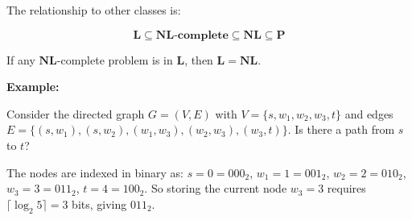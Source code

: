 \documentclass[12pt,a4paper,openany]{article}
\begin{document}
The relationship to other classes is:

\[
\mathbf{L} \subseteq \mathbf{NL\text{-}complete} \subseteq \mathbf{NL} \subseteq \mathbf{P}
\]

If any $\mathbf{NL}$-complete problem is in $\mathbf{L}$, then $\mathbf{L} = \mathbf{NL}$.

\textbf{Example:}

Consider the directed graph $G = (V, E)$ with $V = \{s, w_1, w_2, w_3, t\}$
and edges $E = \{(s, w_1), (s, w_2), (w_1, w_3), (w_2, w_3), (w_3, t)\}$.
Is there a path from $s$ to $t$?

\begin{center}
\end{center}

The nodes are indexed in binary as: $s = 0 = 000_2$, $w_1 = 1 = 001_2$,
$w_2 = 2 = 010_2$, $w_3 = 3 = 011_2$, $t = 4 = 100_2$. So storing the current
node $w_3 = 3$ requires $\lceil \log_2 5 \rceil = 3$ bits, giving $011_2$.
\end{document}
